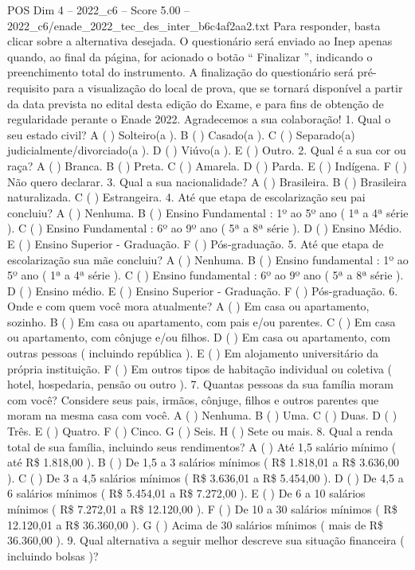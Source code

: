 \begin{textsample}{POS Dim 4 – 2022\_c6 – Score 5.00 – 2022\_c6/enade\_2022\_tec\_des\_inter\_b6c4af2aa2.txt}
Para responder, basta clicar sobre a alternativa desejada.
O questionário será enviado ao Inep apenas quando, ao final da página, for acionado o botão “ Finalizar ”, indicando o preenchimento total do instrumento.
A finalização do questionário será pré-requisito para a visualização do local de prova, que se tornará disponível a partir da data prevista no edital desta edição do Exame, e para fins de obtenção de regularidade perante o Enade 2022.
Agradecemos a sua colaboração! 1.
Qual o seu estado civil?
A ( ) Solteiro(a ).
B ( ) Casado(a ).
C ( ) Separado(a) judicialmente/divorciado(a ).
D ( ) Viúvo(a ).
E ( ) Outro. 2.
Qual é a sua cor ou raça?
A ( ) Branca.
B ( ) Preta.
C ( ) Amarela.
D ( ) Parda.
E ( ) Indígena.
F ( ) Não quero declarar. 3.
Qual a sua nacionalidade?
A ( ) Brasileira.
B ( ) Brasileira naturalizada.
C ( ) Estrangeira. 4.
Até que etapa de escolarização seu pai concluiu?
A ( ) Nenhuma.
B ( ) Ensino Fundamental : 1º ao 5º ano ( 1ª a 4ª série ).
C ( ) Ensino Fundamental : 6º ao 9º ano ( 5ª a 8ª série ).
D ( ) Ensino Médio.
E ( ) Ensino Superior - Graduação.
F ( ) Pós-graduação. 5.
Até que etapa de escolarização sua mãe concluiu?
A ( ) Nenhuma.
B ( ) Ensino fundamental : 1º ao 5º ano ( 1ª a 4ª série ).
C ( ) Ensino fundamental : 6º ao 9º ano ( 5ª a 8ª série ).
D ( ) Ensino médio.
E ( ) Ensino Superior - Graduação.
F ( ) Pós-graduação. 6.
Onde e com quem você mora atualmente?
A ( ) Em casa ou apartamento, sozinho.
B ( ) Em casa ou apartamento, com pais e/ou parentes.
C ( ) Em casa ou apartamento, com cônjuge e/ou filhos.
D ( ) Em casa ou apartamento, com outras pessoas ( incluindo república ).
E ( ) Em alojamento universitário da própria instituição.
F ( ) Em outros tipos de habitação individual ou coletiva ( hotel, hospedaria, pensão ou outro ). 7.
Quantas pessoas da sua família moram com você?
Considere seus pais, irmãos, cônjuge, filhos e outros parentes que moram na mesma casa com você.
A ( ) Nenhuma.
B ( ) Uma.
C ( ) Duas.
D ( ) Três.
E ( ) Quatro.
F ( ) Cinco.
G ( ) Seis.
H ( ) Sete ou mais. 8.
Qual a renda total de sua família, incluindo seus rendimentos?
A ( ) Até 1,5 salário mínimo ( até R\$ 1.818,00 ).
B ( ) De 1,5 a 3 salários mínimos ( R\$ 1.818,01 a R\$ 3.636,00 ).
C ( ) De 3 a 4,5 salários mínimos ( R\$ 3.636,01 a R\$ 5.454,00 ).
D ( ) De 4,5 a 6 salários mínimos ( R\$ 5.454,01 a R\$ 7.272,00 ).
E ( ) De 6 a 10 salários mínimos ( R\$ 7.272,01 a R\$ 12.120,00 ).
F ( ) De 10 a 30 salários mínimos ( R\$ 12.120,01 a R\$ 36.360,00 ).
G ( ) Acima de 30 salários mínimos ( mais de R\$ 36.360,00 ). 9.
Qual alternativa a seguir melhor descreve sua situação financeira ( incluindo bolsas )?

\end{textsample}
